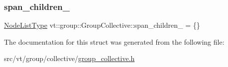 \subsubsection{\texorpdfstring{span\+\_\+children\+\_\+}{span\_children\_}}
{\footnotesize\ttfamily \hyperlink{structvt_1_1group_1_1_group_collective_a24ad1fd43cf03d5026de910d85c7ac96}{Node\+List\+Type} vt\+::group\+::\+Group\+Collective\+::span\+\_\+children\+\_\+ = \{\}\hspace{0.3cm}{\ttfamily [private]}}



The documentation for this struct was generated from the following file\+:\begin{DoxyCompactItemize}
\item 
src/vt/group/collective/\hyperlink{group__collective_8h}{group\+\_\+collective.\+h}\end{DoxyCompactItemize}

